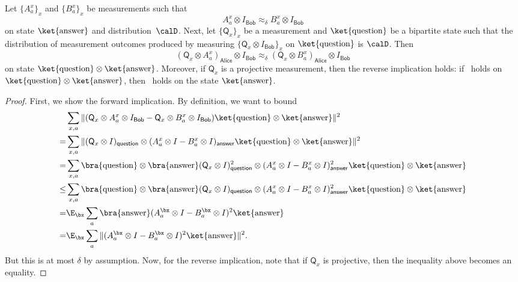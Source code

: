 \documentclass[11pt]{article}
\newcommand{\reg}[1]{{\mathsf{#1}}}
\begin{document}
\begin{fact}\label{fact:introspectivize-it}
Let $\{A^x_a\}_x$ and $\{B^x_a\}_x$ be measurements such that
\begin{equation}\label{eq:outro-approx}
A^x_a \otimes I_{\reg{Bob}} \approx_\delta B^x_a \otimes I_{\reg{Bob}}
\end{equation}
on state $\ket{\mathrm{answer}}$ and distribution~$\calD$. Next, let $\{\mathsf{Q}_x\}_x$ be a measurement and $\ket{\mathrm{question}}$ be a bipartite state
such that the distribution of measurement outcomes produced by measuring $\{\mathsf{Q}_x \otimes I_{\reg{Bob}}\}_x$ on $\ket{\mathrm{question}}$ is $\calD$.
Then
\begin{equation}\label{eq:intro-approx}
(\mathsf{Q}_x \otimes A^x_a)_{\reg{Alice}} \otimes I_{\reg{Bob}} \approx_{\delta} (\mathsf{Q}_x \otimes B^x_a)_{\reg{Alice}} \otimes I_{\reg{Bob}}
\end{equation}
on state $\ket{\mathrm{question}}\otimes
\ket{\mathrm{answer}}$. Moreover, if $\mathsf{Q}_x$ is a projective
measurement, then the reverse implication holds:
if~ holds on $\ket{\mathrm{question}} \otimes
\ket{\mathrm{answer}}$, then~ holds on the state $\ket{\mathrm{answer}}$.
\end{fact}

\begin{proof}
First, we show the forward implication. By definition, we want to bound
\begin{align*}
&\sum_{x, a} \Vert (\mathsf{Q}_x \otimes A^x_a \otimes I_{\reg{Bob}} - \mathsf{Q}_x \otimes B^x_a \otimes I_{\reg{Bob}}) \ket{\mathrm{question}}\otimes \ket{\mathrm{answer}}\Vert^2\\
=& \sum_{x, a} \Vert (\mathsf{Q}_x \otimes I)_{\reg{question}} \otimes (A^x_a \otimes I -   B^x_a \otimes I)_{\reg{answer}} \ket{\mathrm{question}}\otimes \ket{\mathrm{answer}}\Vert^2\\
=& \sum_{x, a} \bra{\mathrm{question}}\otimes \bra{\mathrm{answer}}
	(\mathsf{Q}_x \otimes I)^2_{\reg{question}} \otimes (A^x_a \otimes I -   B^x_a \otimes I)_{\reg{answer}}^2 \ket{\mathrm{question}}\otimes \ket{\mathrm{answer}}\\
\leq& \sum_{x, a} \bra{\mathrm{question}}\otimes \bra{\mathrm{answer}}
	(\mathsf{Q}_x \otimes I)_{\reg{question}} \otimes (A^x_a \otimes I -   B^x_a \otimes I)_{\reg{answer}}^2 \ket{\mathrm{question}}\otimes \ket{\mathrm{answer}}\\
=& \E_{\bx} \sum_{a} \bra{\mathrm{answer}}
	(A^{\bx}_a \otimes I -   B^{\bx}_a \otimes I)^2 \ket{\mathrm{answer}}\\
=& \E_{\bx} \sum_{a} \Vert (A^{\bx}_a \otimes I -   B^{\bx}_a \otimes I)^2\ket{\mathrm{answer}}\Vert^2.
\end{align*}
But this is at most $\delta$ by assumption. Now, for the reverse
implication, note that if $\mathsf{Q}_x$ is projective, then the
inequality above becomes an equality.
\end{proof}
\end{document}
